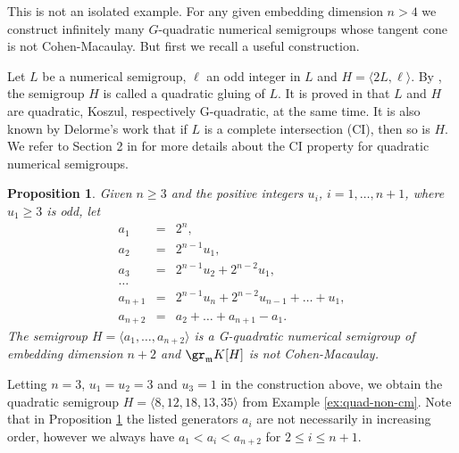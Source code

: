 \documentclass[12pt]{amsart}
\def\frk{\mathfrak}               %
\def\mm{{\frk m}}
\newtheorem{Proposition}[Theorem]{Proposition}
\begin{document}
This is not an isolated example. For any given embedding dimension $n>4$ we   construct infinitely many $G$-quadratic  
numerical semigroups whose tangent cone is not Cohen-Macaulay.  But first we recall a useful construction.

Let $L$ be a numerical semigroup,  $\ell$ an odd integer in $L$ and $H=\langle 2L, \ell \rangle$. By \cite[Definition 2.2]{HeS-quad}, the semigroup  $H$ is called a
quadratic gluing of $L$. It is proved in \cite[Corollary 2.7]{HeS-quad} that $L$ and $H$ are quadratic, Koszul, respectively G-quadratic, at the same time. 
It is also known by Delorme's work \cite{Delorme}  that if $L$ is a complete intersection (CI), then so is $H$.
We refer to Section 2 in \cite{HeS-quad} for more details about the CI property for quadratic numerical semigroups.

\begin{Proposition}
\label{prop:construction}
Given $n \geq 3$ and the positive integers $u_i$, $i=1, \dots, n+1$, where $u_1\geq 3 $ is odd, let 
\begin{eqnarray*}
a_1 &=& 2^{n}, \\
a_2 &=& 2^{n-1} u_1, \\
a_3 &=& 2^{n-1} u_2+ 2^{n-2} u_1,\\
\dots \\
a_{n+1} &=& 2^{n-1} u_n+ 2^{n-2} u_{n-1}+\dots + u_1,\\
a_{n+2} &=& a_2+\dots+ a_{n+1} -a_1.
\end{eqnarray*}
The semigroup  $H=\langle a_1, \dots, a_{n+2} \rangle$ is a G-quadratic  numerical semigroup of embedding dimension $n+2$ and $\gr_\mm K[H]$ is not Cohen-Macaulay. 
\end{Proposition}

Letting $n=3$, $u_1=u_2=3$ and $u_3=1$ in the construction  above,  we obtain the quadratic semigroup  $H= \langle 8, 12, 18, 13, 35 \rangle$ 
from Example \ref{ex:quad-non-cm}. Note that in Proposition \ref{prop:construction} the listed generators $a_i$ are not necessarily in increasing order, however 
we always have $a_1<a_i<a_{n+2}$ for $2\leq i \leq n+1$.
\end{document}

